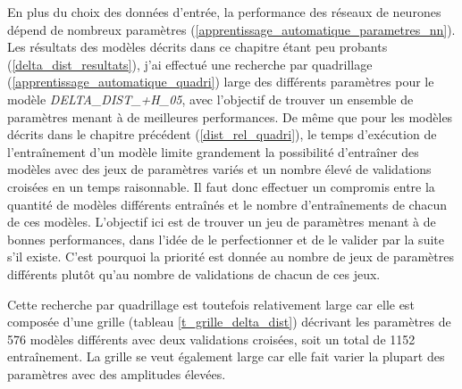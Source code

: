 
\label{delta_dist_quadri}

\par En plus du choix des données d'entrée, la performance des réseaux de neurones dépend de nombreux paramètres (\ref{apprentissage_automatique_parametres_nn}). Les résultats des modèles décrits dans ce chapitre étant peu probants (\ref{delta_dist_resultats}), j'ai effectué une recherche par quadrillage (\ref{apprentissage_automatique_quadri}) large des différents paramètres pour le modèle \emph{DELTA\_DIST\_+H\_05}, avec l'objectif de trouver un ensemble de paramètres menant à de meilleures performances. De même que pour les modèles décrits dans le chapitre précédent (\ref{dist_rel_quadri}), le temps d'exécution de l'entraînement d'un modèle limite grandement la possibilité d'entraîner des modèles avec des jeux de paramètres variés et un nombre élevé de validations croisées en un temps raisonnable. Il faut donc effectuer un compromis entre la quantité de modèles différents entraînés et le nombre d'entraînements de chacun de ces modèles. L'objectif ici est de trouver un jeu de paramètres menant à de bonnes performances, dans l'idée de le perfectionner et de le valider par la suite s'il existe. C'est pourquoi la priorité est donnée au nombre de jeux de paramètres différents plutôt qu'au nombre de validations de chacun de ces jeux.

\par Cette recherche par quadrillage est toutefois relativement large car elle est composée d'une grille (tableau \ref{t_grille_delta_dist}) décrivant les paramètres de 576 modèles différents avec deux validations croisées, soit un total de 1152 entraînement. La grille se veut également large car elle fait varier la plupart des paramètres avec des amplitudes élevées.

